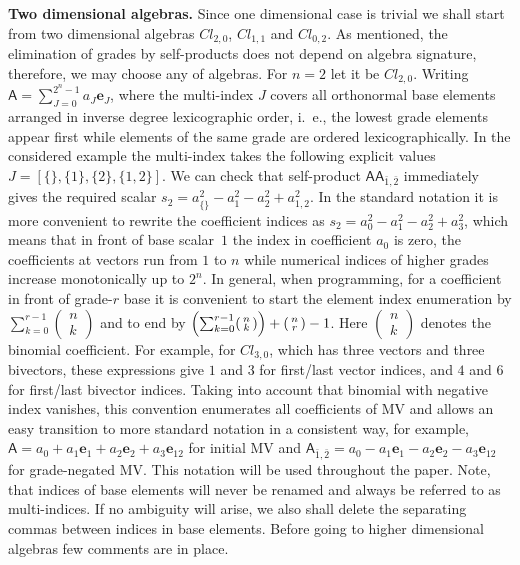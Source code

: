 \documentclass{birkjour}
\newcommand{\cl}[2]{\ensuremath{\mathit{Cl}_{#1,#2}}} %
\newcommand{\e}[1]{\mathbf{e}_{#1}} %
\def\m#1{\mathsf{#1}} %
\begin{document}
{\bf Two dimensional algebras.} Since one dimensional case is
trivial we shall start from two dimensional algebras $Cl_{2,0}$,
$Cl_{1,1}$ and $Cl_{0,2}$. As mentioned,  the  elimination of
grades  by self-products does not depend on algebra signature,
therefore, we may choose any of algebras. For $n=2$ let it be
$Cl_{2,0}$. Writing $\m{A} = \sum_{J=0}^{2^n-1} a_J\e{J}$, where
the multi-index $J$ covers all orthonormal base elements arranged
in inverse degree lexicographic order, i.~e., the lowest grade
elements appear first while elements of the same grade are ordered
lexicographically. In the considered example the multi-index takes
the following explicit values $J=[\{\},\{1\},\{2\},\{1,2\}]$. We
can check that self-product $\m{A} \m{A}_{\bar 1,\bar 2}$
immediately gives the required scalar $s_2=a_{\{\}}^2 - a_{1}^2 -
a_{2}^2 + a_{1,2}^2$. In the standard notation it is more
convenient to rewrite the coefficient indices as $s_2=a_{0}^2 -
a_{1}^2 - a_{2}^2 + a_{3}^2$, which means that  in front of base
scalar~$1$ the index in  coefficient  $a_{0}$ is zero, the
coefficients at vectors run from $1$ to $n$ while numerical
indices of higher grades increase monotonically up to $2^n$. In
general, when programming, for a coefficient in front of grade-$r$
base it is convenient to start the element index
enumeration by $\sum_{k=0}^{r-1} (\begin{smallmatrix}n\\
k\end{smallmatrix})$ and to end by
$\Bigl(\sum_{k=0}^{r-1} (\begin{smallmatrix}n\\
k\end{smallmatrix})\Bigr)+(\begin{smallmatrix}n\\
r\end{smallmatrix})-1$.  Here $(\begin{smallmatrix}n\\
k\end{smallmatrix})$ denotes the binomial coefficient. For
example, for \cl{3}{0}, which has three vectors and three
bivectors, these expressions give $1$ and $3$ for first/last
vector indices, and $4$ and $6$ for first/last bivector indices.
Taking into account that binomial with negative index vanishes,
this convention enumerates all coefficients of MV and allows an
easy transition to more standard notation in a consistent way, for
example, $\m{A}=a_0 + a_1\e{1} + a_2\e{2} + a_3\e{12}$ for initial
MV and $\m{A}_{\bar 1,\bar 2}=a_0 - a_1\e{1}- a_2\e{2}- a_3\e{12}$
for grade-negated MV.  This notation  will be used throughout the
paper. Note, that indices of base elements will never be renamed
and always be referred to as multi-indices. If no ambiguity will
arise, we also shall delete the separating commas between indices
in base elements. Before  going to higher dimensional algebras few
comments are in place.
\end{document}
